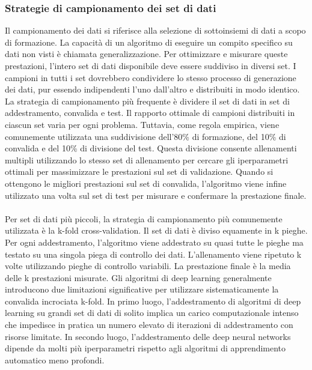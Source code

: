 \documentclass[12pt,a4paper]{report}
\begin{document}
\subsubsection{Strategie di campionamento dei set di dati}
Il campionamento dei dati si riferisce alla selezione di sottoinsiemi di dati a scopo di formazione. La capacità di un algoritmo di eseguire un compito specifico su dati non visti è chiamata generalizzazione. Per ottimizzare e misurare queste prestazioni, l'intero set di dati disponibile deve essere suddiviso in diversi set. I campioni in tutti i set dovrebbero condividere lo stesso processo di generazione dei dati, pur essendo indipendenti l'uno dall'altro e distribuiti in modo identico.\\
La strategia di campionamento più frequente è dividere il set di dati in set di addestramento, convalida e test.
Il rapporto ottimale di campioni distribuiti in ciascun set varia per ogni problema. Tuttavia, come regola empirica, viene comunemente utilizzata una suddivisione dell'80\% di formazione, del 10\% di convalida e del 10\% di divisione del test. Questa divisione consente allenamenti multipli utilizzando lo stesso set di allenamento per cercare gli iperparametri ottimali per massimizzare le prestazioni sul set di validazione. Quando si ottengono le migliori prestazioni sul set di convalida, l'algoritmo viene infine utilizzato una volta sul set di test per misurare e confermare la prestazione finale.\\
\\
Per set di dati più piccoli, la strategia di campionamento più comunemente utilizzata è la k-fold cross-validation. Il set di dati è diviso equamente in k pieghe. Per ogni addestramento, l'algoritmo viene addestrato su quasi tutte le pieghe ma testato su una singola piega di controllo dei dati. L'allenamento viene ripetuto k volte utilizzando pieghe di controllo variabili. La prestazione finale è la media delle k prestazioni misurate.
Gli algoritmi di deep learning generalmente introducono due limitazioni significative per utilizzare sistematicamente la convalida incrociata k-fold. In primo luogo, l'addestramento di algoritmi di deep learning su grandi set di dati di solito implica un carico computazionale intenso che impedisce in pratica un numero elevato di iterazioni di addestramento con risorse limitate. In secondo luogo, l'addestramento delle deep neural networks dipende da molti più iperparametri rispetto agli algoritmi di apprendimento automatico meno profondi.\\
\end{document}
